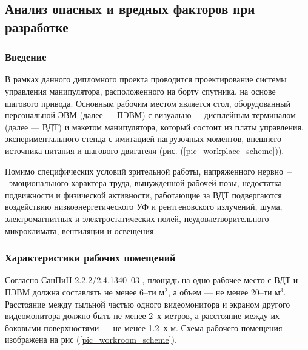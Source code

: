 \subsection{Анализ опасных и вредных факторов при разработке}

\subsubsection{Введение}

В рамках данного дипломного проекта проводится проектирование системы управления
манипулятора, расположенного на борту спутника, на основе шагового привода.
Основным рабочим местом является стол, оборудованный персональной ЭВМ
(далее --- ПЭВМ) с визуально~--~дисплейным терминалом (далее --- ВДТ) и макетом
манипулятора, который состоит из платы управления, экспериментального стенда с
имитацией нагрузочных моментов, внешнего источника питания и шагового двигателя
(рис. (\ref{pic_workplace_scheme})).

Помимо специфических условий зрительной работы, напряженного
нервно~--~эмоционального характера труда, вынужденной рабочей позы, недостатка
подвижности и физической активности, работающие за ВДТ подвергаются воздействию
низкоэнергетического УФ и рентгеновского излучений, шума, электромагнитных и
электростатических полей, неудовлетворительного микроклимата, вентиляции и
освещения.

\subsubsection{Характеристики рабочих помещений}

Согласно СанПиН 2.2.2/2.4.1340--03 \cite{ecology_sanpin_1340_03}, площадь на одно
рабочее место с ВДТ и ПЭВМ должна составлять не менее 6--ти $\text{м}^2$, а объем
--- не менее 20--ти $\text{м}^3$. Расстояние между тыльной частью одного видеомонитора
и экраном другого видеомонитора должно быть не менее 2--х метров, а расстояние
между их боковыми поверхностями --- не менее 1.2--х м. Схема рабочего помещения
изображена на рис (\ref{pic_workroom_scheme}).

